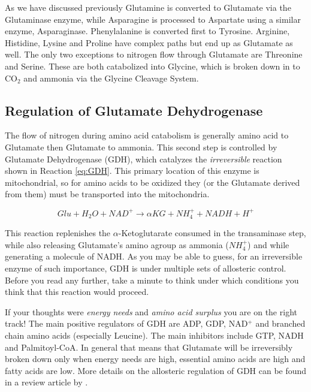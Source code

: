 \documentclass{tufte-handout}
\begin{document}
  As we have discussed previously Glutamine is converted to Glutamate via the Glutaminase enzyme, while Asparagine is processed to Aspartate using a similar enzyme, Asparaginase.  Phenylalanine is converted first to Tyrosine.  Arginine, Histidine, Lysine and Proline have complex paths but end up as Glutamate as well.  The only two exceptions to nitrogen flow through Glutamate are Threonine and Serine.  These are both catabolized into Glycine, which is broken down in to CO$_2$ and ammonia via the Glycine Cleavage System.

\subsection{Regulation of Glutamate Dehydrogenase}

The flow of nitrogen during amino acid catabolism is generally amino acid to Glutamate then Glutamate to ammonia.  This second step is controlled by Glutamate Dehydrogenase (GDH), which catalyzes the \emph{irreversible} reaction shown in Reaction \ref{eq:GDH}.  This primary location of this enzyme is mitochondrial, so for amino acids to be oxidized they (or the Glutamate derived from them) must be transported into the mitochondria.

\begin{equation}\label{eq:GDH}
Glu + H_2O + NAD^+  \rightarrow  \alpha KG + NH_4^+ + NADH + H^+
\end{equation}

This reaction replenishes the $\alpha$-Ketoglutarate consumed in the transaminase step, while also releasing Glutamate's amino agroup as ammonia ($NH_4^+$) and while generating a molecule of NADH.  As you may be able to guess, for an irreversible enzyme of such importance, GDH is under multiple sets of allosteric control.  Before you read any further, take a minute to think under which conditions you think that this reaction would proceed.

If your thoughts were \emph{energy needs} and \emph{amino acid surplus} you are on the right track!  The main positive regulators of GDH are ADP, GDP, NAD$^+$ and branched chain amino acids (especially Leucine).  The main inhibitors include GTP, NADH and Palmitoyl-CoA.  In general that means that Glutamate will be irreversibly broken down only when energy needs are high, essential amino acids are high and fatty acids are low.  More details on the allosteric regulation of GDH can be found in a review article by \citet{Smith2008}.  
\end{document}
